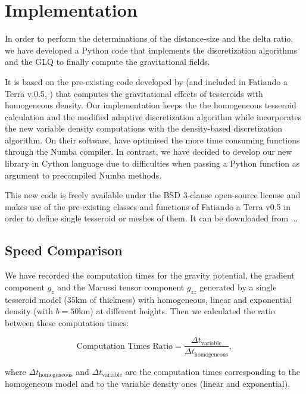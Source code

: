 \documentclass[extra]{gji}
\begin{document}
\section{Implementation}

In order to perform the determinations of the distance-size and the 
delta ratio, we have developed a Python code that implements the 
discretization algorithms and the GLQ to finally compute the 
gravitational fields.

It is based on the pre-existing code developed by \citet{Uieda2016} (and 
included in Fatiando a Terra v.0.5, \citet{Uieda2013}) that computes 
the gravitational effects of tesseroids with homogeneous density.
Our implementation keeps the the homogeneous tesseroid calculation and 
the modified adaptive discretization algorithm while incorporates the 
new variable density computations with the density-based discretization 
algorithm.
On their software, \citet{Uieda2016} have optimised the more time 
consuming functions through the Numba compiler.
In contrast, we have decided to develop our new library in Cython 
language due to difficulties when passing a Python function as argument 
to precompiled Numba methods.

This new code is freely available under the BSD 3-clause open-source 
license and makes use of the pre-existing classes and functions of 
Fatiando a Terra v0.5 in order to define single tesseroid or meshes of 
them.
It can be downloaded from ...


\subsection{Speed Comparison}

We have recorded the computation times for the gravity potential, the gradient component $g_z$ and the Marussi tensor component $g_{zz}$ generated by a single tesseroid model ($35$km of thickness) with homogeneous, linear and exponential density (with $b=50$km) at different heights. Then we calculated the ratio between these computation times:

\begin{equation}
    \text{Computation Times Ratio} =
        \frac{\Delta t_\text{variable}}{\Delta t_\text{homogeneous}},
    \label{eq:computation-times-ratio}
\end{equation}

\noindent where $\Delta t_\text{homogeneous}$ and $\Delta t_\text{variable}$ are the computation times corresponding to the homogeneous model and to the variable density ones (linear and exponential).
\end{document}
